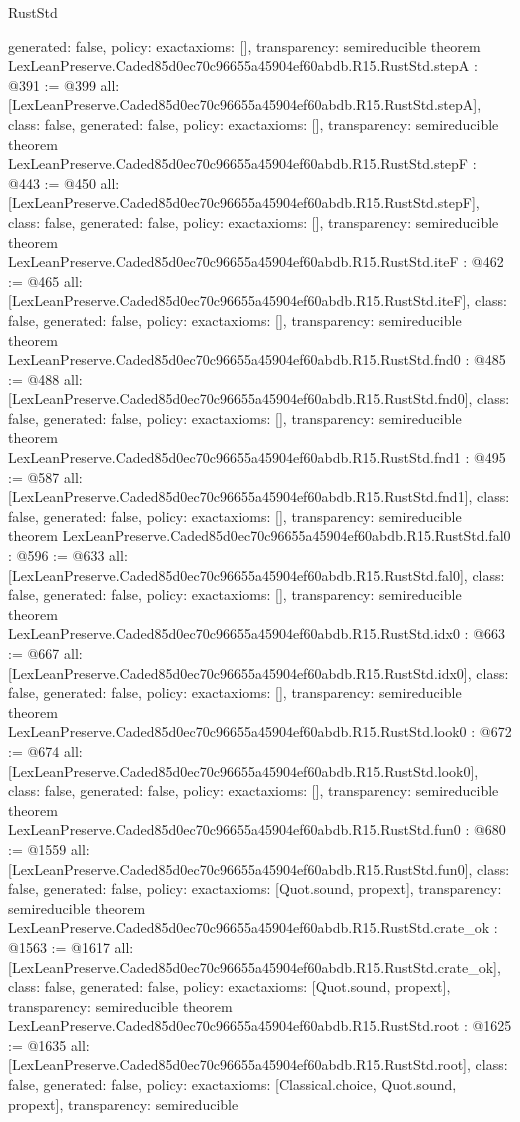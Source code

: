\begin{lexlean}{RustStd}
\begin{coremodule}
{  generated: false,
  policy: exact{axioms: []},
  transparency: semireducible
}
theorem LexLeanPreserve.Caded85d0ec70c96655a45904ef60abdb.R15.RustStd.stepA : @391 := @399 {
  all: [LexLeanPreserve.Caded85d0ec70c96655a45904ef60abdb.R15.RustStd.stepA],
  class: false,
  generated: false,
  policy: exact{axioms: []},
  transparency: semireducible
}
theorem LexLeanPreserve.Caded85d0ec70c96655a45904ef60abdb.R15.RustStd.stepF : @443 := @450 {
  all: [LexLeanPreserve.Caded85d0ec70c96655a45904ef60abdb.R15.RustStd.stepF],
  class: false,
  generated: false,
  policy: exact{axioms: []},
  transparency: semireducible
}
theorem LexLeanPreserve.Caded85d0ec70c96655a45904ef60abdb.R15.RustStd.iteF : @462 := @465 {
  all: [LexLeanPreserve.Caded85d0ec70c96655a45904ef60abdb.R15.RustStd.iteF],
  class: false,
  generated: false,
  policy: exact{axioms: []},
  transparency: semireducible
}
theorem LexLeanPreserve.Caded85d0ec70c96655a45904ef60abdb.R15.RustStd.fnd0 : @485 := @488 {
  all: [LexLeanPreserve.Caded85d0ec70c96655a45904ef60abdb.R15.RustStd.fnd0],
  class: false,
  generated: false,
  policy: exact{axioms: []},
  transparency: semireducible
}
theorem LexLeanPreserve.Caded85d0ec70c96655a45904ef60abdb.R15.RustStd.fnd1 : @495 := @587 {
  all: [LexLeanPreserve.Caded85d0ec70c96655a45904ef60abdb.R15.RustStd.fnd1],
  class: false,
  generated: false,
  policy: exact{axioms: []},
  transparency: semireducible
}
theorem LexLeanPreserve.Caded85d0ec70c96655a45904ef60abdb.R15.RustStd.fal0 : @596 := @633 {
  all: [LexLeanPreserve.Caded85d0ec70c96655a45904ef60abdb.R15.RustStd.fal0],
  class: false,
  generated: false,
  policy: exact{axioms: []},
  transparency: semireducible
}
theorem LexLeanPreserve.Caded85d0ec70c96655a45904ef60abdb.R15.RustStd.idx0 : @663 := @667 {
  all: [LexLeanPreserve.Caded85d0ec70c96655a45904ef60abdb.R15.RustStd.idx0],
  class: false,
  generated: false,
  policy: exact{axioms: []},
  transparency: semireducible
}
theorem LexLeanPreserve.Caded85d0ec70c96655a45904ef60abdb.R15.RustStd.look0 : @672 := @674 {
  all: [LexLeanPreserve.Caded85d0ec70c96655a45904ef60abdb.R15.RustStd.look0],
  class: false,
  generated: false,
  policy: exact{axioms: []},
  transparency: semireducible
}
theorem LexLeanPreserve.Caded85d0ec70c96655a45904ef60abdb.R15.RustStd.fun0 : @680 := @1559 {
  all: [LexLeanPreserve.Caded85d0ec70c96655a45904ef60abdb.R15.RustStd.fun0],
  class: false,
  generated: false,
  policy: exact{axioms: [Quot.sound, propext]},
  transparency: semireducible
}
theorem LexLeanPreserve.Caded85d0ec70c96655a45904ef60abdb.R15.RustStd.crate_ok : @1563 := @1617 {
  all: [LexLeanPreserve.Caded85d0ec70c96655a45904ef60abdb.R15.RustStd.crate_ok],
  class: false,
  generated: false,
  policy: exact{axioms: [Quot.sound, propext]},
  transparency: semireducible
}
theorem LexLeanPreserve.Caded85d0ec70c96655a45904ef60abdb.R15.RustStd.root : @1625 := @1635 {
  all: [LexLeanPreserve.Caded85d0ec70c96655a45904ef60abdb.R15.RustStd.root],
  class: false,
  generated: false,
  policy: exact{axioms: [Classical.choice, Quot.sound, propext]},
  transparency: semireducible
}


\end{coremodule}
\end{lexlean}
